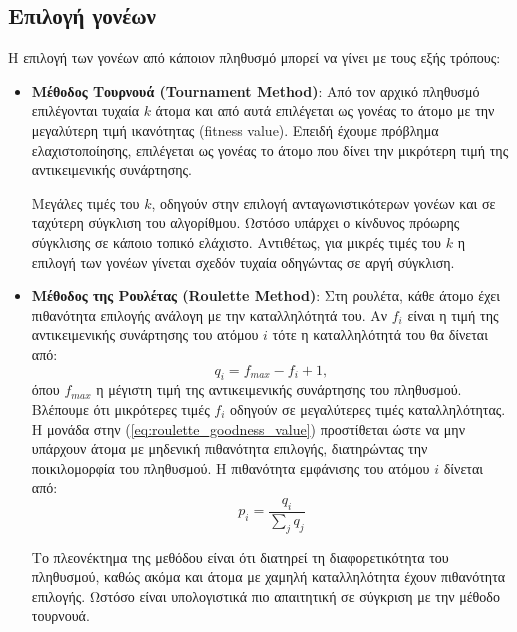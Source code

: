 \documentclass[a4paper,12pt]{article}
\begin{document}
\subsection{Επιλογή γονέων}
Η επιλογή των γονέων από κάποιον πληθυσμό μπορεί να γίνει με τους εξής τρόπους:
\begin{itemize}
    \item \textbf{Μέθοδος Τουρνουά (Tournament Method)}:
    Από τον αρχικό πληθυσμό επιλέγονται τυχαία $k$ άτομα και από αυτά επιλέγεται ως γονέας το άτομο
    με την μεγαλύτερη τιμή ικανότητας (fitness value).
    Επειδή έχουμε πρόβλημα ελαχιστοποίησης, επιλέγεται ως γονέας το άτομο που δίνει την μικρότερη τιμή
    της αντικειμενικής συνάρτησης. 
    
    Μεγάλες τιμές του $k$, οδηγούν στην επιλογή ανταγωνιστικότερων γονέων
    και σε ταχύτερη σύγκλιση του αλγορίθμου. Ωστόσο υπάρχει ο κίνδυνος πρόωρης σύγκλισης σε κάποιο τοπικό
    ελάχιστο. Αντιθέτως, για μικρές τιμές του $k$ η επιλογή των γονέων γίνεται σχεδόν τυχαία οδηγώντας σε 
    αργή σύγκλιση.

    \item \textbf{Μέθοδος της Ρουλέτας (Roulette Method)}:
    Στη ρουλέτα, κάθε άτομο έχει πιθανότητα επιλογής ανάλογη με την καταλληλότητά του. Αν $f_i$ είναι η
    τιμή της αντικειμενικής συνάρτησης του ατόμου $i$ τότε η καταλληλότητά του θα δίνεται από:
    \begin{equation}
        q_i = f_{max} - f_i + 1,
        \label{eq:roulette_goodness_value}
    \end{equation}
    όπου $f_{max}$ η μέγιστη τιμή της αντικειμενικής συνάρτησης του πληθυσμού. Βλέπουμε ότι μικρότερες τιμές
    $f_i$ οδηγούν σε μεγαλύτερες τιμές καταλληλότητας. Η μονάδα στην (\ref{eq:roulette_goodness_value}) προστίθεται
    ώστε να μην υπάρχουν άτομα με μηδενική πιθανότητα επιλογής, διατηρώντας την ποικιλομορφία του πληθυσμού.
    Η πιθανότητα εμφάνισης του ατόμου $i$ δίνεται από:
    \begin{equation}
        p_i = \frac{q_i}{\sum_{j}q_j}
        \label{eq:roulette_selection_probability}
    \end{equation}

    Το πλεονέκτημα της μεθόδου είναι ότι διατηρεί τη διαφορετικότητα του πληθυσμού, καθώς ακόμα και άτομα με χαμηλή 
    καταλληλότητα έχουν πιθανότητα επιλογής. Ωστόσο είναι υπολογιστικά πιο απαιτητική σε σύγκριση με την μέθοδο τουρνουά.


\end{itemize}
\end{document}
